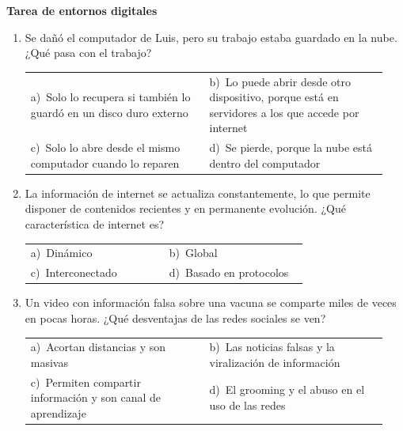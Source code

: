 \documentclass[11pt,a4paper]{article}
\begin{document}
\raggedright
{\Large\bfseries Tarea de entornos digitales}
\vspace{10pt}
\begin{enumerate}[label=\textbf{\arabic*.},leftmargin=*,itemsep=6pt,topsep=0pt]
\item \begin{minipage}[t]{\linewidth}
Se dañó el computador de Luis, pero su trabajo estaba guardado en la nube. ¿Qué pasa con el trabajo?

\vspace{4pt}
\begin{tabular}{@{}>{\raggedright\arraybackslash}p{0.47\linewidth}>{\raggedright\arraybackslash}p{0.47\linewidth}@{}}
a)~Solo lo recupera si también lo guardó en un disco duro externo & b)~Lo puede abrir desde otro dispositivo, porque está en servidores a los que accede por internet \\
c)~Solo lo abre desde el mismo computador cuando lo reparen & d)~Se pierde, porque la nube está dentro del computador \\
\end{tabular}
\end{minipage}

\item \begin{minipage}[t]{\linewidth}
La información de internet se actualiza constantemente, lo que permite disponer de contenidos recientes y en permanente evolución. ¿Qué característica de internet es?

\vspace{4pt}
\begin{tabular}{@{}>{\raggedright\arraybackslash}p{0.47\linewidth}>{\raggedright\arraybackslash}p{0.47\linewidth}@{}}
a)~Dinámico & b)~Global \\
c)~Interconectado & d)~Basado en protocolos \\
\end{tabular}
\end{minipage}

\item \begin{minipage}[t]{\linewidth}
Un video con información falsa sobre una vacuna se comparte miles de veces en pocas horas. ¿Qué desventajas de las redes sociales se ven?

\vspace{4pt}
\begin{tabular}{@{}>{\raggedright\arraybackslash}p{0.47\linewidth}>{\raggedright\arraybackslash}p{0.47\linewidth}@{}}
a)~Acortan distancias y son masivas & b)~Las noticias falsas y la viralización de información \\
c)~Permiten compartir información y son canal de aprendizaje & d)~El grooming y el abuso en el uso de las redes \\
\end{tabular}
\end{minipage}


\end{enumerate}
\end{document}
